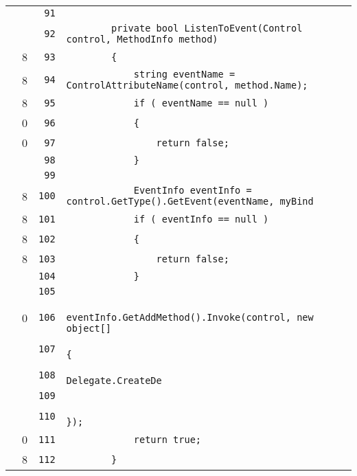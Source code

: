 \documentclass[a4paper,10pt]{article}
\begin{document}
\begin{longtable}[l]{lrrl}
\cellcolor{gray} &  & \verb~91~ & \verb~~\\
\cellcolor{gray} &  & \verb~92~ & \verb~        private bool ListenToEvent(Control control, MethodInfo method)~\\
\cellcolor{green} & 8 & \verb~93~ & \verb~        {~\\
\cellcolor{green} & 8 & \verb~94~ & \verb~            string eventName = ControlAttributeName(control, method.Name);~\\
\cellcolor{green} & 8 & \verb~95~ & \verb~            if ( eventName == null )~\\
\cellcolor{red} & 0 & \verb~96~ & \verb~            {~\\
\cellcolor{red} & 0 & \verb~97~ & \verb~                return false;~\\
\cellcolor{gray} &  & \verb~98~ & \verb~            }~\\
\cellcolor{gray} &  & \verb~99~ & \verb~~\\
\cellcolor{green} & 8 & \verb~100~ & \verb~            EventInfo eventInfo = control.GetType().GetEvent(eventName, myBind~\\
\cellcolor{green} & 8 & \verb~101~ & \verb~            if ( eventInfo == null )~\\
\cellcolor{green} & 8 & \verb~102~ & \verb~            {~\\
\cellcolor{green} & 8 & \verb~103~ & \verb~                return false;~\\
\cellcolor{gray} &  & \verb~104~ & \verb~            }~\\
\cellcolor{gray} &  & \verb~105~ & \verb~~\\
\cellcolor{red} & 0 & \verb~106~ & \verb~            eventInfo.GetAddMethod().Invoke(control, new object[]~\\
\cellcolor{gray} &  & \verb~107~ & \verb~                                                         {~\\
\cellcolor{gray} &  & \verb~108~ & \verb~                                                             Delegate.CreateDe~\\
\cellcolor{gray} &  & \verb~109~ & \verb~                                                                              ~\\
\cellcolor{gray} &  & \verb~110~ & \verb~                                                         });~\\
\cellcolor{red} & 0 & \verb~111~ & \verb~            return true;~\\
\cellcolor{green} & 8 & \verb~112~ & \verb~        }~\\

\end{longtable}
\end{document}
